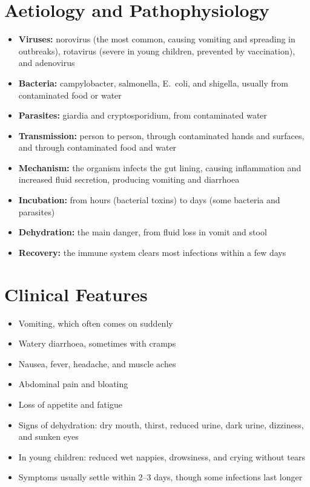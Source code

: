 \section*{Aetiology and Pathophysiology}
\begin{itemize}
    \item \textbf{Viruses:} norovirus (the most common, causing vomiting and spreading in outbreaks), rotavirus (severe in young children, prevented by vaccination), and adenovirus
    \item \textbf{Bacteria:} campylobacter, salmonella, E.\ coli, and shigella, usually from contaminated food or water
    \item \textbf{Parasites:} giardia and cryptosporidium, from contaminated water
    \item \textbf{Transmission:} person to person, through contaminated hands and surfaces, and through contaminated food and water
    \item \textbf{Mechanism:} the organism infects the gut lining, causing inflammation and increased fluid secretion, producing vomiting and diarrhoea
    \item \textbf{Incubation:} from hours (bacterial toxins) to days (some bacteria and parasites)
    \item \textbf{Dehydration:} the main danger, from fluid loss in vomit and stool
    \item \textbf{Recovery:} the immune system clears most infections within a few days
\end{itemize}

\section*{Clinical Features}
\begin{itemize}
    \item Vomiting, which often comes on suddenly
    \item Watery diarrhoea, sometimes with cramps
    \item Nausea, fever, headache, and muscle aches
    \item Abdominal pain and bloating
    \item Loss of appetite and fatigue
    \item Signs of dehydration: dry mouth, thirst, reduced urine, dark urine, dizziness, and sunken eyes
    \item In young children: reduced wet nappies, drowsiness, and crying without tears
    \item Symptoms usually settle within 2--3 days, though some infections last longer
\end{itemize}

